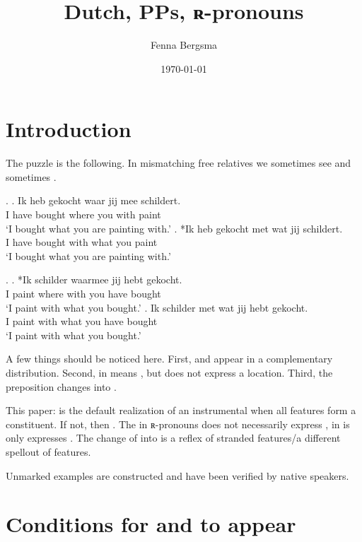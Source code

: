 \documentclass{article}
\title{Dutch, PPs, ʀ-pronouns}
\author{Fenna Bergsma}
\date{\today}
\begin{document}
\maketitle




\section{Introduction}

The puzzle is the following. In mismatching free relatives we sometimes see  and sometimes .

\ex.
\ag. Ik heb gekocht waar jij mee schildert.\\
 I have bought where you with paint\\
 `I bought what you are painting with.'
\bg. *Ik heb gekocht met wat jij schildert.\\
 I have bought with what you paint\\
 `I bought what you are painting with.'

\ex.
\ag. *Ik schilder waarmee jij hebt gekocht.\\
 I paint {where with} you have bought\\
 `I paint with what you bought.'
\bg. Ik schilder met wat jij hebt gekocht.\\
 I paint with what you have bought\\
 `I paint with what you bought.'

A few things should be noticed here. First,  and  appear in a complementary distribution. Second,  in  means , but  does not express a location. Third, the preposition  changes into .

This paper:  is the default realization of an instrumental when all features form a constituent. If not, then . The  in ʀ-pronouns does not necessarily express , in  is only expresses . The change of  into  is a reflex of stranded features/a different spellout of features.

Unmarked examples are constructed and have been verified by native speakers.



\section{Conditions for  and  to appear}
\end{document}

